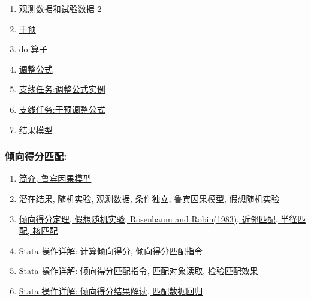 \documentclass[11pt]{article}
\begin{document}
\begin{multicols}{3}
\begin{enumerate}
		\item \href{https://mp.weixin.qq.com/s/o-CXebk_5XEgsNOFgPFELQ}{观测数据和试验数据 2}	%
		\item \href{https://mp.weixin.qq.com/s/vwlbqxVd0VccyC8d9560VA}{干预}	%
		\item \href{https://mp.weixin.qq.com/s/yRsmm3m4-Gml4omoORn52Q}{do 算子}	%
		\item \href{https://mp.weixin.qq.com/s/-qLTS8iGjqj6IKS3S5GxWg}{调整公式}	%
		\item \href{https://mp.weixin.qq.com/s/SFulXDLBui7nJSZJemwYkg}{支线任务:调整公式实例}	%
		\item \href{https://mp.weixin.qq.com/s/u2cRH1uGTJoPweWrLHuEdA}{支线任务:干预调整公式}	%
		\item \href{https://mp.weixin.qq.com/s/nYpB7nC794hEPtlY8eY9WQ}{结果模型}	%
	\end{enumerate}
\end{multicols}

\subsubsection*{\href{https://space.bilibili.com/421438815/lists/813891?type=season}{\kaishu 倾向得分匹配:}}

\vspace{-0.25cm}

\begin{enumerate}
	\item \href{URLhttps://mp.weixin.qq.com/s/nqHhY8w6u1Od2Mfl6e97Fg}{简介, 鲁宾因果模型}
	\item \href{https://mp.weixin.qq.com/s/Uu3KEcNG3ECdbC8bL_NtKA}{潜在结果, 随机实验, 观测数据, 条件独立, 鲁宾因果模型, 假想随机实验}
	\item \href{https://mp.weixin.qq.com/s/gLDTBrMqyW93nOzYDJy6IQ}{倾向得分定理, 假想随机实验, Rosenbaum and Robin(1983), 近邻匹配, 半径匹配, 核匹配}
	\item \href{https://mp.weixin.qq.com/s/v0Kq34XXf0jGO0gtS-BTng}{Stata 操作详解: 计算倾向得分, 倾向得分匹配指令}
	\item \href{https://mp.weixin.qq.com/s/uUXJzggQCx--5i5vs_-_hw}{Stata 操作详解: 倾向得分匹配指令, 匹配对象读取, 检验匹配效果}
	\item \href{https://mp.weixin.qq.com/s/NvAopch22BI4-IJc07E0eg}{Stata 操作详解: 倾向得分结果解读, 匹配数据回归}
\end{enumerate}
\end{document}
